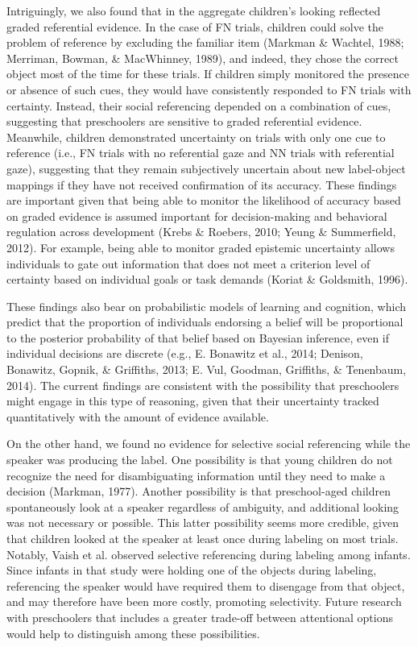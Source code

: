 \documentclass[a4paper,man,apacite,floatsintext]{apa6}
\begin{document}
Intriguingly, we also found that in the aggregate children's looking
reflected graded referential evidence. In the case of FN trials,
children could solve the problem of reference by excluding the familiar
item (Markman \& Wachtel, 1988; Merriman, Bowman, \& MacWhinney, 1989),
and indeed, they chose the correct object most of the time for these
trials. If children simply monitored the presence or absence of such
cues, they would have consistently responded to FN trials with
certainty. Instead, their social referencing depended on a combination
of cues, suggesting that preschoolers are sensitive to graded
referential evidence. Meanwhile, children demonstrated uncertainty on
trials with only one cue to reference (i.e., FN trials with no
referential gaze and NN trials with referential gaze), suggesting that
they remain subjectively uncertain about new label-object mappings if
they have not received confirmation of its accuracy. These findings are
important given that being able to monitor the likelihood of accuracy
based on graded evidence is assumed important for decision-making and
behavioral regulation across development (Krebs \& Roebers, 2010; Yeung
\& Summerfield, 2012). For example, being able to monitor graded
epistemic uncertainty allows individuals to gate out information that
does not meet a criterion level of certainty based on individual goals
or task demands (Koriat \& Goldsmith, 1996).

These findings also bear on probabilistic models of learning and
cognition, which predict that the proportion of individuals endorsing a
belief will be proportional to the posterior probability of that belief
based on Bayesian inference, even if individual decisions are discrete
(e.g., E. Bonawitz et al., 2014; Denison, Bonawitz, Gopnik, \&
Griffiths, 2013; E. Vul, Goodman, Griffiths, \& Tenenbaum, 2014). The
current findings are consistent with the possibility that preschoolers
might engage in this type of reasoning, given that their uncertainty
tracked quantitatively with the amount of evidence available.

On the other hand, we found no evidence for selective social referencing
while the speaker was producing the label. One possibility is that young
children do not recognize the need for disambiguating information until
they need to make a decision (Markman, 1977). Another possibility is
that preschool-aged children spontaneously look at a speaker regardless
of ambiguity, and additional looking was not necessary or possible. This
latter possibility seems more credible, given that children looked at
the speaker at least once during labeling on most trials. Notably, Vaish
et al. observed selective referencing during labeling among infants.
Since infants in that study were holding one of the objects during
labeling, referencing the speaker would have required them to disengage
from that object, and may therefore have been more costly, promoting
selectivity. Future research with preschoolers that includes a greater
trade-off between attentional options would help to distinguish among
these possibilities.
\end{document}

